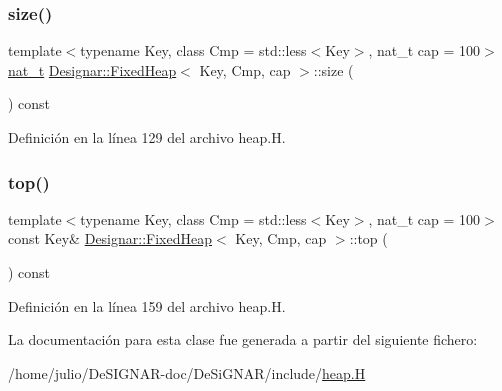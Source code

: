 \subsubsection{\texorpdfstring{size()}{size()}}
{\footnotesize\ttfamily template$<$typename Key, class Cmp = std\+::less$<$\+Key$>$, nat\+\_\+t cap = 100$>$ \\
\hyperlink{namespace_designar_aa72662848b9f4815e7bf31a7cf3e33d1}{nat\+\_\+t} \hyperlink{class_designar_1_1_fixed_heap}{Designar\+::\+Fixed\+Heap}$<$ Key, Cmp, cap $>$\+::size (\begin{DoxyParamCaption}{ }\end{DoxyParamCaption}) const\hspace{0.3cm}{\ttfamily [inline]}}



Definición en la línea 129 del archivo heap.\+H.

\mbox{\label{class_designar_1_1_fixed_heap_a2b48592e01a0b8836a18415219a310ca}} 
\subsubsection{\texorpdfstring{top()}{top()}}
{\footnotesize\ttfamily template$<$typename Key, class Cmp = std\+::less$<$\+Key$>$, nat\+\_\+t cap = 100$>$ \\
const Key\& \hyperlink{class_designar_1_1_fixed_heap}{Designar\+::\+Fixed\+Heap}$<$ Key, Cmp, cap $>$\+::top (\begin{DoxyParamCaption}{ }\end{DoxyParamCaption}) const\hspace{0.3cm}{\ttfamily [inline]}}



Definición en la línea 159 del archivo heap.\+H.



La documentación para esta clase fue generada a partir del siguiente fichero\+:\begin{DoxyCompactItemize}
\item 
/home/julio/\+De\+S\+I\+G\+N\+A\+R-\/doc/\+De\+Si\+G\+N\+A\+R/include/\hyperlink{heap_8_h}{heap.\+H}\end{DoxyCompactItemize}
